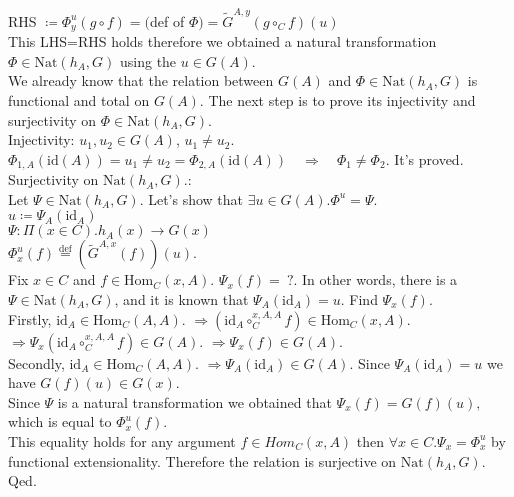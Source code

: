 \documentclass[10pt,a4paper]{article}
\theoremstyle{definition}
\newcommand{\Hom}{{\mbox{Hom}}}
\newcommand{\Nat}{{\mbox{Nat}}}
\newcommand{\GMor}{{\widetilde{G}\mbox{}}}
\newcommand{\id}{{\mbox{id}}}
\newcommand{\defi}{{\mbox{def}}}
\newcommand{\eqdef}{{\stackrel{\defi}{=}}}
\begin{document}
RHS $\coloneqq \Phi^u_y(g\circ f)=($def of $\Phi)=\GMor^{A,y}\left(g\circ_C f\right)(u)$\\
This LHS=RHS holds therefore we obtained a natural transformation $\Phi\in\Nat(h_A,G)$ using the $u\in G(A)$.\\
We already know that the relation between $G(A)$ and $\Phi\in\Nat(h_A,G)$ is functional and total on $G(A)$.
The next step is to prove its injectivity and surjectivity on $\Phi\in\Nat(h_A,G)$.\\
Injectivity: $u_1,u_2\in G(A)$, $u_1\neq u_2$.\\
$\Phi_{1,A}(\id(A))= u_1\neq u_2 = \Phi_{2,A}(\id(A))\quad \Longrightarrow \quad \Phi_1 \neq \Phi_2$. It's proved. \\
Surjectivity on $\Nat(h_A,G)$.:\\
Let $\Psi\in\Nat(h_A,G)$. Let's show that $\exists u\in G(A).\Phi^u=\Psi$.\\
$u\coloneqq \Psi_A(\id_A)$\\
$\Psi:\Pi(x\in C). h_A(x)\to G(x)$\\
$\Phi^u_x(f) \eqdef (\GMor^{A,x}(f))(u)$.\\
Fix $x\in C$ and $f\in\Hom_C(x,A)$. $\Psi_x(f)=\ ?$.
In other words, there is a $\Psi\in\Nat(h_A,G)$, and it is known that $\Psi_A(\id_A) = u$. Find $\Psi_x(f)$.\\
Firstly, $\id_A \in \Hom_C(A,A)$. $\Longrightarrow (\id_A \circ_C^{x,A,A} f) \in \Hom_C(x,A)$. $\Longrightarrow \Psi_x(\id_A \circ_C^{x,A,A} f)\in G(A)$. $\Longrightarrow \Psi_x(f)\in G(A)$.\\
Secondly, $\id_A \in \Hom_C(A,A)$. $\Longrightarrow \Psi_A(\id_A) \in G(A)$. Since $\Psi_A(\id_A)=u$ we have $G(f)(u)\in G(x)$.\\
Since $\Psi$ is a natural transformation we obtained that $\Psi_x(f)=G(f)(u),$ which is equal to $\Phi^u_x(f)$.\\
This equality holds for any argument $f\in Hom_C(x,A)$ then $\forall x\in C. \Psi_x=\Phi^u_x$ by functional extensionality. Therefore the relation is surjective on $\Nat(h_A,G)$.
Qed.\\
\end{document}
